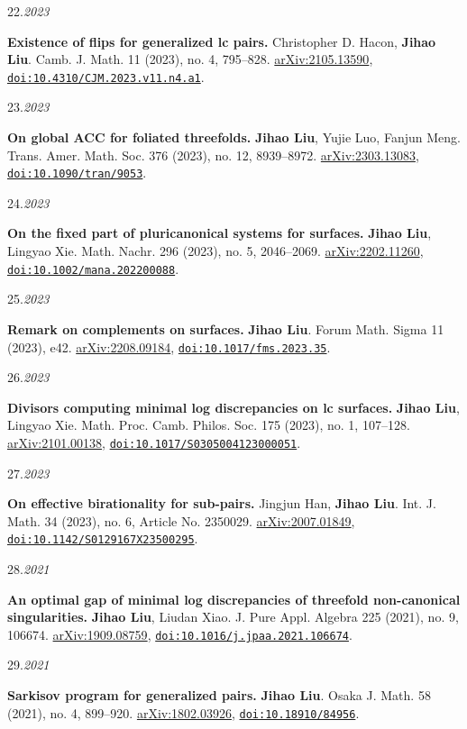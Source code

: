 \documentclass[11pt]{article}
\newlength{\datewidth}
\newcommand{\pubitem}[3]{%
  \noindent
  \begin{minipage}[t]{\datewidth}
    \raggedright\small\color{muted}#1.\;\textit{#2}
  \end{minipage}%
  \hfill%
  \begin{minipage}[t]{\dimexpr\linewidth-\datewidth-0.1in\relax}
    \raggedright #3
  \end{minipage}\par\vspace{4pt}
}
\newcommand{\paper}[1]{\textbf{#1}}
\newcommand{\me}{\textbf{Jihao Liu}}
\newcommand{\idlink}[2]{\href{#1}{\nolinkurl{#2}}}
\begin{document}
\pubitem{22}{2023}{%
  \paper{Existence of flips for generalized lc pairs.}
  Christopher D. Hacon, \me.
  Camb. J. Math. 11 (2023), no. 4, 795--828.
  \href{https://arxiv.org/abs/2105.13590}{arXiv:2105.13590}, \idlink{https://dx.doi.org/10.4310/CJM.2023.v11.n4.a1}{doi:10.4310/CJM.2023.v11.n4.a1}.}


\pubitem{23}{2023}{%
  \paper{On global ACC for foliated threefolds.}
  \me, Yujie Luo, Fanjun Meng.
  Trans. Amer. Math. Soc. 376 (2023), no. 12, 8939--8972.
  \href{https://arxiv.org/abs/2303.13083}{arXiv:2303.13083}, \idlink{https://doi.org/10.1090/tran/9053}{doi:10.1090/tran/9053}.}


\pubitem{24}{2023}{%
  \paper{On the fixed part of pluricanonical systems for surfaces.}
  \me, Lingyao Xie.
  Math. Nachr. 296 (2023), no. 5, 2046--2069.
  \href{https://arxiv.org/abs/2202.11260}{arXiv:2202.11260}, \idlink{https://doi.org/10.1002/mana.202200088}{doi:10.1002/mana.202200088}.}


\pubitem{25}{2023}{%
  \paper{Remark on complements on surfaces.}
  \me.
  Forum Math. Sigma 11 (2023), e42.
  \href{https://arxiv.org/abs/2208.09184}{arXiv:2208.09184}, \idlink{https://doi.org/10.1017/fms.2023.35}{doi:10.1017/fms.2023.35}.}


\pubitem{26}{2023}{%
  \paper{Divisors computing minimal log discrepancies on lc surfaces.}
  \me, Lingyao Xie.
  Math. Proc. Camb. Philos. Soc. 175 (2023), no. 1, 107--128.
  \href{https://arxiv.org/abs/2101.00138}{arXiv:2101.00138}, \idlink{https://doi.org/10.1017/S0305004123000051}{doi:10.1017/S0305004123000051}.}


\pubitem{27}{2023}{%
  \paper{On effective birationality for sub-pairs.}
  Jingjun Han, \me.
  Int. J. Math. 34 (2023), no. 6, Article No. 2350029.
  \href{https://arxiv.org/abs/2007.01849}{arXiv:2007.01849}, \idlink{https://doi.org/10.1142/S0129167X23500295}{doi:10.1142/S0129167X23500295}.}


\pubitem{28}{2021}{%
  \paper{An optimal gap of minimal log discrepancies of threefold non-canonical singularities.}
  \me, Liudan Xiao.
  J. Pure Appl. Algebra 225 (2021), no. 9, 106674.
  \href{https://arxiv.org/abs/1909.08759}{arXiv:1909.08759}, \idlink{https://doi.org/10.1016/j.jpaa.2021.106674}{doi:10.1016/j.jpaa.2021.106674}.}


\pubitem{29}{2021}{%
  \paper{Sarkisov program for generalized pairs.}
  \me.
  Osaka J. Math. 58 (2021), no. 4, 899--920.
  \href{https://arxiv.org/abs/1802.03926}{arXiv:1802.03926}, \idlink{https://doi.org/10.18910/84956}{doi:10.18910/84956}.}
\end{document}
